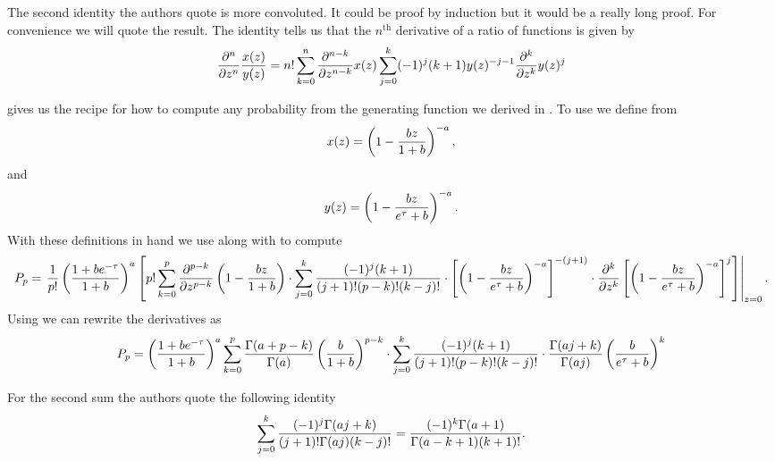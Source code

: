 The second identity the authors quote is more convoluted. It could be proof by
induction but it would be a really long proof. For convenience we will quote
the result. The identity tells us that the $n^{\text{th}}$ derivative of a ratio
of functions is given by
\begin{equation}
  {\partial ^n \over \partial z^n} {x(z) \over y(z)} =
  n! \sum_{k=0}^n {\partial ^{n-k} \over \partial z^{n-k}} x(z)
  \sum_{j = 0}^k (-1)^j (k + 1) y(z)^{-j-1}
  {\partial^k \over \partial z^k} y(z)^j
  \label{eq_derivative_ratio}
\end{equation}

 gives us the recipe for how to compute any
probability from the generating function we derived in
. To use  we define from
\begin{equation}
  x(z) = \left( 1 - {b z \over 1 + b} \right)^{-a},
\end{equation}
and
\begin{equation}
  y(z) = \left( 1 - {b z \over e^{\tau} + b} \right)^{-a}.
\end{equation}
With these definitions in hand we use  along with
 to compute
\begin{equation}
  \tiny
  P_p = \left. {1 \over p!} \left( {1 + b e^{-\tau} \over 1 + b} \right)^a
  \left[ p! \sum_{k=0}^p  {\partial^{p-k} \over \partial z^{p-k}}
  \left(1 - {b z \over 1 + b} \right) \cdot
  \sum_{j=0}^k {(-1)^j (k + 1) \over (j + 1)! (p - k)! (k - j)!} \cdot
  \left[ \left( 1 - {b z \over e^\tau + b} \right)^{-a} \right]^{-(j+1)} \cdot
  {\partial^k \over \partial z^k}
  \left[ \left( 1 - {b z \over e^\tau + b}  \right)^{-a} \right]^j
  \right]\right\vert _{z=0}.
\end{equation}
Using  we can rewrite the derivatives as
\begin{equation}
  \small
  P_p = \left( {1 + b e^{-\tau} \over 1 + b} \right)^a
  \sum_{k=0}^p {\Gamma(a + p - k) \over \Gamma(a)}
  \left( {b \over 1 + b} \right)^{p - k} \cdot
  \sum_{j=0}^k {(-1)^j (k + 1) \over (j + 1)! (p - k)! (k - j)!} \cdot
  {\Gamma(aj + k) \over \Gamma(aj)} \left( {b \over e^\tau + b} \right)^k
\end{equation}

For the second sum the authors quote the following identity
\begin{equation}
  \sum_{j=0}^k {(-1)^j \Gamma(aj + k) \over (j + 1)! \Gamma(aj) (k - j)!} =
  {(-1)^k \Gamma(a + 1) \over \Gamma(a - k + 1) (k + 1)!}.
\end{equation}

